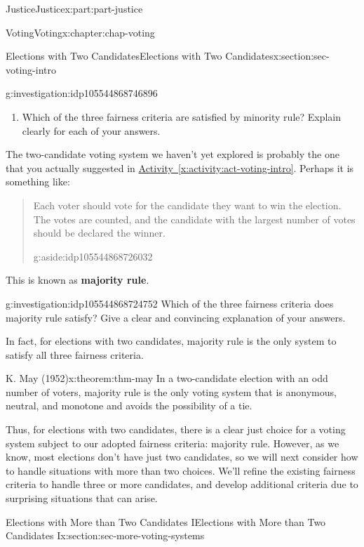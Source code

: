 \documentclass[oneside,10pt,]{book}
\newcommand{\xreffont}{\relax}
\newcommand{\terminology}[1]{\textbf{#1}}
\numberwithin{equation}{section}
\begin{document}
\begin{partptx}{Justice}{}{Justice}{}{}{x:part:part-justice}
\begin{chapterptx}{Voting}{}{Voting}{}{}{x:chapter:chap-voting}
\begin{sectionptx}{Elections with Two Candidates}{}{Elections with Two Candidates}{}{}{x:section:sec-voting-intro}
\begin{investigation}{}{g:investigation:idp105544868746896}
\begin{enumerate}
\item{}Which of the three fairness criteria are satisfied by minority rule? Explain clearly for each of your answers.%
\end{enumerate}
\end{investigation}%
The two-candidate voting system we haven't yet explored is probably the one that you actually suggested in \hyperref[x:activity:act-voting-intro]{Activity~{\xreffont\ref{x:activity:act-voting-intro}}}. Perhaps it is something like:%
\begin{quote}%
Each voter should vote for the candidate they want to win the election. The votes are counted, and the candidate with the largest number of votes should be declared the winner.\begin{aside}{}{g:aside:idp105544868726032}%
\end{aside}
\end{quote}
This is known as \terminology{majority rule}.%
\begin{investigation}{}{g:investigation:idp105544868724752}%
Which of the three fairness criteria does majority rule satisfy? Give a clear and convincing explanation of your answers.%
\end{investigation}%
In fact, for elections with two candidates, majority rule is the only system to satisfy all three fairness criteria.%
\begin{theorem}{}{K. May (1952)}{x:theorem:thm-may}%
In a two-candidate election with an odd number of voters, majority rule is the only voting system that is anonymous, neutral, and monotone and avoids the possibility of a tie.%
\end{theorem}
\begin{conclusion}{}%
Thus, for elections with two candidates, there is a clear just choice for a voting system subject to our adopted fairness criteria: majority rule. However, as we know, most elections don't have just two candidates, so we will next consider how to handle situations with more than two choices. We'll refine the existing fairness criteria to handle three or more candidates, and develop additional criteria due to surprising situations that can arise.%
\end{conclusion}%
\end{sectionptx}
%
%
\typeout{************************************************}
\typeout{************************************************}
%
\begin{sectionptx}{Elections with More than Two Candidates I}{}{Elections with More than Two Candidates I}{}{}{x:section:sec-more-voting-systems}

\end{sectionptx}
\end{chapterptx}
\end{partptx}
\end{document}
